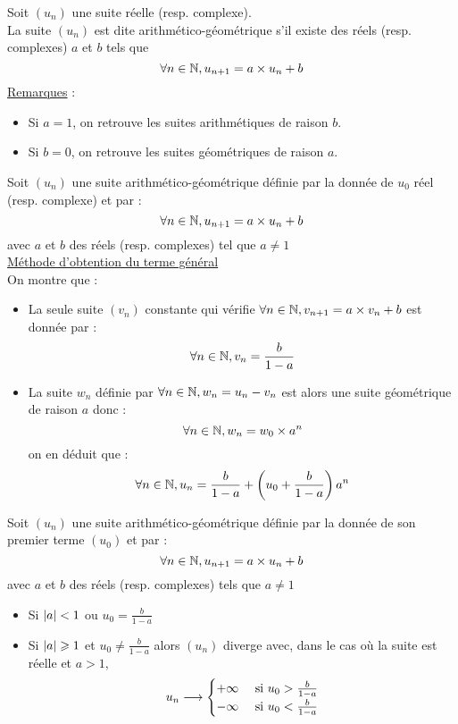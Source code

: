 \begin{defi}
    Soit \((u_n)\) une suite réelle (resp. complexe).\\
    La suite \((u_n)\) est dite arithmético-géométrique s’il existe des réels (resp. complexes) \(a\) et \(b\) tels que
    \[\forall n \in \mathbb{N}, u_{n+1} = a\times u_n + b\]
    \underline{Remarques} :\\
    \begin{itemize}
        \item Si \(a = 1\), on retrouve les suites arithmétiques de raison \(b\).
        \item Si \(b = 0\), on retrouve les suites géométriques de raison \(a\).
    \end{itemize}
\end{defi}

\begin{defprop}
    Soit \((u_n)\) une suite arithmético-géométrique définie par la donnée de \(u_0\) réel (resp. complexe) et par :
    \[\forall n \in \mathbb{N}, u_{n+1} = a\times u_n + b\]
    avec \(a\) et \(b\) des réels (resp. complexes) tel que \(a\neq 1\)\\
    \underline{Méthode d’obtention du terme général }\\
    On montre que : \\
    \begin{itemize}
        \item La seule suite \((v_n)\) constante qui vérifie \(\forall n \in \mathbb{N}, v_{n+1} = a\times v_n + b\) est donnée par : 
        \[\forall n \in \mathbb{N},v_n = \frac{b}{1-a}\]
        \item La suite \(w_n\) définie par \(\forall n \in \mathbb{N} , w_n = u_n-v_n\) est alors une suite géométrique de raison \(a\) donc : 
        \[\forall n \in \mathbb{N}, w_n = w_0\times a^n\]
        on en déduit que :
        \[\forall n \in \mathbb{N}, u_n = \frac{b}{1-a} + \left(u_0 + \frac{b}{1-a}\right)a^n\]
    \end{itemize}
\end{defprop}

\begin{defprop}[Limite]
    Soit \((u_n)\) une suite arithmético-géométrique définie par la donnée de son premier terme \((u_0)\) et par :
    \[\forall n \in \mathbb{N}, u_{n+1} = a\times u_n + b\]
    avec \(a\) et \(b\) des réels (resp. complexes) tels que \(a\neq 1\)
    \begin{itemize}
        \item Si \(\left\lvert a\right\rvert<1\) ou \(u_0 = \frac{b}{1-a}\)
        \item Si \(\left\lvert a\right\rvert \geqslant 1\) et \(u_0 \neq \frac{b}{1-a}\) alors \((u_n)\) diverge avec, dans le cas où la suite est réelle et \(a > 1\),
        \[ u_n \longrightarrow \begin{cases}
            +\infty & \text{ si } u_0>\frac{b}{1-a}\\
            -\infty& \text{ si } u_0<\frac{b}{1-a}
        \end{cases}\]
    \end{itemize}
\end{defprop}

